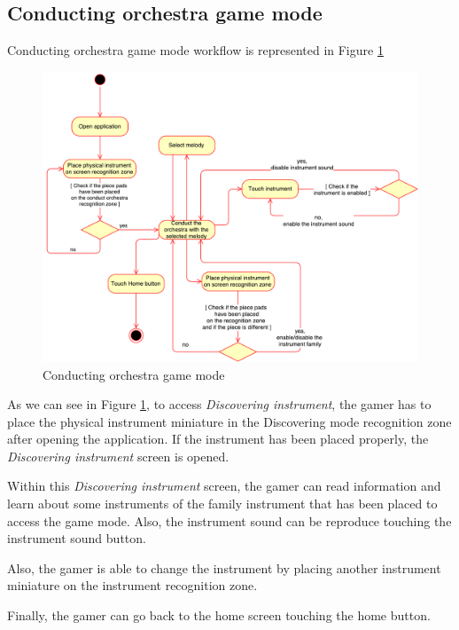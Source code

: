 \newpage
\subsection{Conducting orchestra game mode}
\label{subsec:conducteorchestra_arch}

Conducting orchestra game mode workflow is represented in Figure \ref{fig:conductingworkflow}

\begin{figure}[ht!]
	\centering
	\includegraphics[width=400pt]{graphics/architecture/ConductingGameMode.pdf}
	\caption{Conducting orchestra game mode}
	\label{fig:conductingworkflow}
\end{figure}

As we can see in Figure \ref{fig:conductingworkflow}, to access \textit{Discovering instrument}, the gamer has to place the physical instrument miniature in the Discovering mode recognition zone after opening the application. If the instrument has been placed properly, the \textit{Discovering instrument} screen is opened.

Within this \textit{Discovering instrument} screen, the gamer can read information and learn about some instruments of the family instrument that has been placed to access the game mode. Also, the instrument sound can be reproduce touching the instrument sound button.

Also, the gamer is able to change the instrument by placing another instrument miniature on the instrument recognition zone.

Finally, the gamer can go back to the home screen touching the home button.

